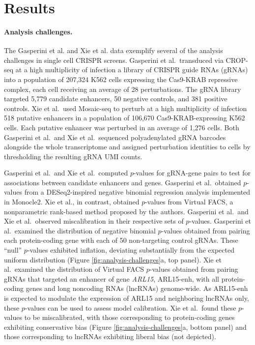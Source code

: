 \documentclass{nature}
\begin{document}
\section*{Results}

\paragraph{Analysis challenges.} 

The Gasperini et al.\cite{Gasperini2019} and Xie et al.\cite{Xie2019} data exemplify several of the analysis challenges in single cell CRISPR screens. Gasperini et al.\ transduced via CROP-seq\cite{Datlinger2017,Hill2018}  at a high multiplicity of infection a library of CRISPR guide RNAs (gRNAs) into a population of 207,324 K562 cells expressing the Cas9-KRAB repressive complex, each cell receiving an average of 28 perturbations. The gRNA library targeted 5,779 candidate enhancers, 50 negative controls, and 381 positive controls. Xie et al.\ used Mosaic-seq\cite{Xie2019,Xie2017} to perturb at a high multiplicity of infection 518 putative enhancers in a population of 106,670 Cas9-KRAB-expressing K562 cells. Each putative enhancer was perturbed in an average of 1,276 cells. Both Gasperini et al.\ and Xie et al.\ sequenced polyadenylated gRNA barcodes alongside the whole transcriptome and assigned perturbation identities to cells by thresholding the resulting gRNA UMI counts.

Gasperini et al.\ and Xie et al.\ computed $p$-values for gRNA-gene pairs
to test for associations between candidate enhancers and genes. Gasperini et al.\ obtained $p$-values from a DESeq2\cite{Love2014}-inspired negative binomial regression analysis implemented in Monocle2.\cite{Qiu2017} Xie et al., in contrast, obtained $p$-values from Virtual FACS, a nonparametric rank-based method proposed by the authors.\cite{Xie2017} Gasperini et al.\ and Xie et al.\  observed miscalibration in their respective sets of $p$-values. Gasperini et al.\ examined the distribution of negative binomial $p$-values obtained from pairing each protein-coding gene with each of 50 non-targeting control gRNAs. These ``null'' $p$-values exhibited inflation, deviating substantially from the expected uniform distribution (Figure \ref{fig:analysis-challenges}a, top panel). Xie et al.\ examined the distribution of Virtual FACS $p$-values obtained from pairing gRNAs that targeted an enhancer of gene \textit{ARL15}, ARL15-enh, with all protein-coding genes and long noncoding RNAs (lncRNAs) genome-wide. As ARL15-enh is expected to modulate the expression of ARL15 and neighboring lncRNAs only, these $p$-values can be used to assess model calibration. Xie et al.\
 found these $p$-values to be miscalibrated, with those corresponding to protein-coding genes exhibiting conservative bias (Figure \ref{fig:analysis-challenges}a, bottom panel) and those corresponding to lncRNAs exhibiting liberal bias (not depicted).
 
\end{document}
